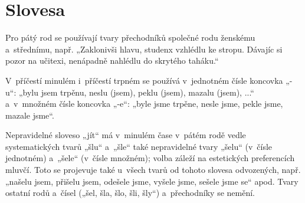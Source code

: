 %
%
%
\section{Slovesa}

Pro pátý rod se používají tvary přechodníků společné rodu ženskému a střednímu, např. „Zaklonivši hlavu, studenx vzhlédlu ke stropu. Dávajíc si pozor na učitexi, nenápadně nahlédlu do skrytého taháku.“

V příčestí minulém i příčestí trpném se používá v jednotném čísle koncovka „-u“: „bylu jsem trpěnu, neslu (jsem), peklu (jsem), mazalu (jsem), ...“ a v množném čísle koncovka „-e“: „byle jsme trpěne, nesle jsme, pekle jsme, mazale jsme“.

Nepravidelné sloveso „jít“ má v minulém čase v pátém rodě vedle systematických tvarů „šlu“ a „šle“ také nepravidelné tvary „šelu“ (v čísle jednotném) a „šele“ (v čísle množném); volba záleží na estetických preferencích mluvčí. Toto se projevuje také u všech tvarů od tohoto slovesa odvozených, např. „našelu jsem, přišelu jsem, odešele jsme, vyšele jsme, sešele jsme se“ apod. Tvary ostatní rodů a čísel („šel, šla, šlo, šli, šly“) a přechodníky se nemění.

